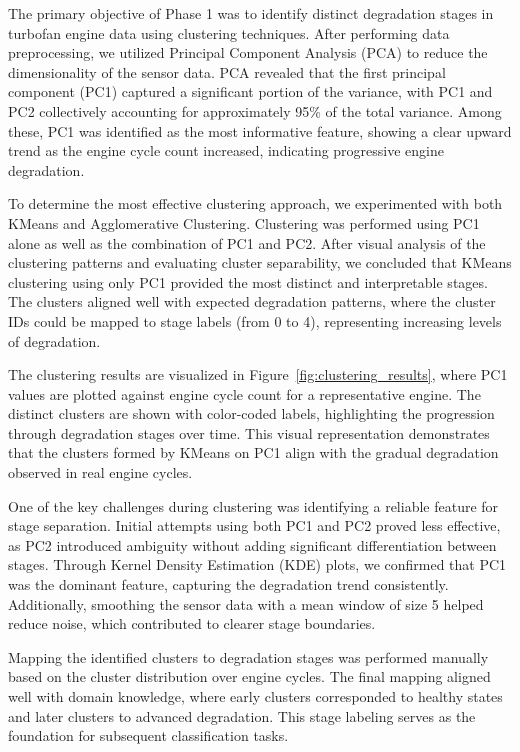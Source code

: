 \documentclass[conference]{IEEEtran}
\begin{document}
The primary objective of Phase 1 was to identify distinct degradation stages in turbofan engine data using clustering techniques. After performing data preprocessing, we utilized Principal Component Analysis (PCA) to reduce the dimensionality of the sensor data. PCA revealed that the first principal component (PC1) captured a significant portion of the variance, with PC1 and PC2 collectively accounting for approximately 95\% of the total variance. Among these, PC1 was identified as the most informative feature, showing a clear upward trend as the engine cycle count increased, indicating progressive engine degradation.

To determine the most effective clustering approach, we experimented with both KMeans and Agglomerative Clustering. Clustering was performed using PC1 alone as well as the combination of PC1 and PC2. After visual analysis of the clustering patterns and evaluating cluster separability, we concluded that KMeans clustering using only PC1 provided the most distinct and interpretable stages. The clusters aligned well with expected degradation patterns, where the cluster IDs could be mapped to stage labels (from 0 to 4), representing increasing levels of degradation.

The clustering results are visualized in Figure~\ref{fig:clustering_results}, where PC1 values are plotted against engine cycle count for a representative engine. The distinct clusters are shown with color-coded labels, highlighting the progression through degradation stages over time. This visual representation demonstrates that the clusters formed by KMeans on PC1 align with the gradual degradation observed in real engine cycles. 

One of the key challenges during clustering was identifying a reliable feature for stage separation. Initial attempts using both PC1 and PC2 proved less effective, as PC2 introduced ambiguity without adding significant differentiation between stages. Through Kernel Density Estimation (KDE) plots, we confirmed that PC1 was the dominant feature, capturing the degradation trend consistently. Additionally, smoothing the sensor data with a mean window of size 5 helped reduce noise, which contributed to clearer stage boundaries.

Mapping the identified clusters to degradation stages was performed manually based on the cluster distribution over engine cycles. The final mapping aligned well with domain knowledge, where early clusters corresponded to healthy states and later clusters to advanced degradation. This stage labeling serves as the foundation for subsequent classification tasks.
\end{document}
